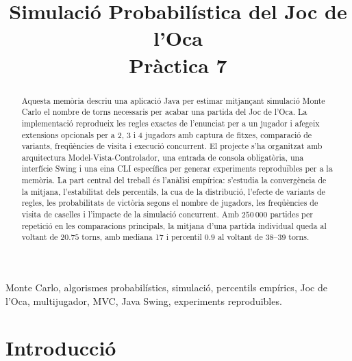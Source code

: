 \documentclass[conference,compsoc]{IEEEtran}
\begin{document}
\title{Simulació Probabilística del Joc de l'Oca\\Pràctica 7}

\author{
}

\maketitle

\begin{strip}
\begin{abstract}
Aquesta memòria descriu una aplicació Java per estimar mitjançant simulació Monte
Carlo el nombre de torns necessaris per acabar una partida del Joc de l'Oca. La
implementació reprodueix les regles exactes de l'enunciat per a un jugador i
afegeix extensions opcionals per a 2, 3 i 4 jugadors amb captura de fitxes,
comparació de variants, freqüències de visita i execució concurrent. El projecte s'ha organitzat amb
arquitectura Model-Vista-Controlador, una entrada de consola obligatòria, una
interfície Swing i una eina CLI específica per generar experiments reproduïbles per
a la memòria. La part central del treball és l'anàlisi empírica: s'estudia la
convergència de la mitjana, l'estabilitat dels percentils, la cua de la
distribució, l'efecte de variants de regles, les probabilitats de victòria segons
el nombre de jugadors, les freqüències de visita de caselles i l'impacte de la
simulació concurrent. Amb $250\,000$ partides per repetició en les comparacions
principals, la mitjana d'una
partida individual queda al voltant de $20.75$ torns, amb mediana 17 i percentil
$0.9$ al voltant de 38--39 torns.
\end{abstract}

\begin{IEEEkeywords}
Monte Carlo, algorismes probabilístics, simulació, percentils empírics, Joc de
l'Oca, multijugador, MVC, Java Swing, experiments reproduïbles.
\end{IEEEkeywords}
\end{strip}

\IEEEpeerreviewmaketitle

\section{Introducció}
\end{document}
